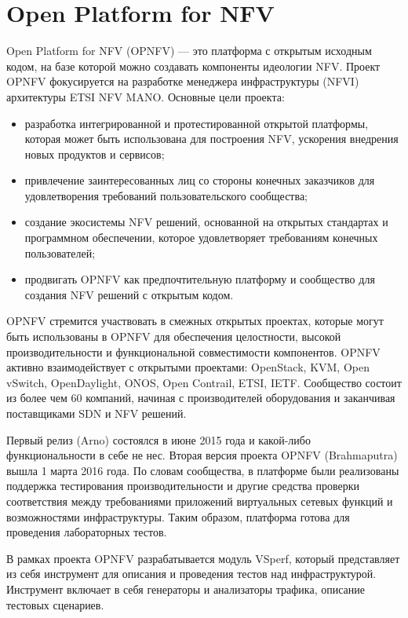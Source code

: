 \documentclass[oneside,final,14pt,a4paper]{extreport}
\begin{document}
\section{Open Platform for NFV}
Open Platform for NFV\cite{bib:opnfv} (OPNFV)  --- это платформа с открытым исходным кодом, на базе которой можно создавать компоненты  идеологии NFV. Проект OPNFV фокусируется на разработке менеджера инфраструктуры (NFVI) архитектуры ETSI NFV MANO. Основные цели проекта:
\begin{itemize}
	\item разработка интегрированной и протестированной открытой платформы, которая может быть использована для построения NFV, ускорения внедрения новых продуктов и сервисов;
	\item привлечение заинтересованных лиц со стороны конечных заказчиков для удовлетворения требований пользовательского сообщества;
	\item создание экосистемы NFV решений, основанной на открытых стандартах и программном обеспечении, которое удовлетворяет требованиям конечных пользователей;
	\item продвигать OPNFV как предпочтительную платформу и сообщество для создания NFV решений с открытым кодом.
\end{itemize}

OPNFV стремится участвовать в смежных открытых проектах, которые могут быть использованы в OPNFV для обеспечения целостности, высокой производительности и функциональной совместимости компонентов. OPNFV активно взаимодействует с открытыми проектами: OpenStack, KVM, Open vSwitch, OpenDaylight, ONOS, Open Contrail, ETSI, IETF. Сообщество состоит из более чем 60 компаний, начиная с производителей оборудования и заканчивая поставщиками SDN и NFV решений.

Первый релиз (Arno) состоялся в июне 2015 года и какой-либо функциональности в себе не нес.
Вторая версия проекта OPNFV (Brahmaputra) вышла 1 марта 2016 года. По словам сообщества, в платформе были реализованы поддержка тестирования производительности и другие средства проверки соответствия между требованиями приложений виртуальных сетевых функций и возможностями инфраструктуры. Таким образом, платформа готова для проведения лабораторных тестов. 

В рамках проекта OPNFV разрабатывается модуль VSperf, который представляет из себя инструмент для описания и проведения тестов над инфраструктурой. Инструмент включает в себя генераторы и анализаторы трафика, описание тестовых сценариев.
\end{document}
